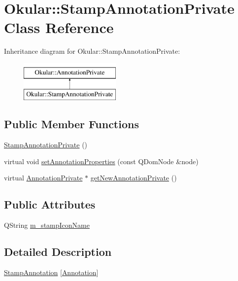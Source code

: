 \hypertarget{classOkular_1_1StampAnnotationPrivate}{\section{Okular\+:\+:Stamp\+Annotation\+Private Class Reference}
\label{classOkular_1_1StampAnnotationPrivate}
}
Inheritance diagram for Okular\+:\+:Stamp\+Annotation\+Private\+:\begin{figure}[H]
\begin{center}
\leavevmode
\includegraphics[height=2.000000cm]{classOkular_1_1StampAnnotationPrivate}
\end{center}
\end{figure}
\subsection*{Public Member Functions}
\begin{DoxyCompactItemize}
\item 
\hyperlink{classOkular_1_1StampAnnotationPrivate_abf10ead1f7fea1bc1c900da707e0908d}{Stamp\+Annotation\+Private} ()
\item 
virtual void \hyperlink{classOkular_1_1StampAnnotationPrivate_a7c9d1cfd69ab82bdc9fa8d718a933801}{set\+Annotation\+Properties} (const Q\+Dom\+Node \&node)
\item 
virtual \hyperlink{classOkular_1_1AnnotationPrivate}{Annotation\+Private} $\ast$ \hyperlink{classOkular_1_1StampAnnotationPrivate_a43e8ee99a2e2b3454a5decdd3311871a}{get\+New\+Annotation\+Private} ()
\end{DoxyCompactItemize}
\subsection*{Public Attributes}
\begin{DoxyCompactItemize}
\item 
Q\+String \hyperlink{classOkular_1_1StampAnnotationPrivate_aaa0eb79998614b5fe42f55b97ead553b}{m\+\_\+stamp\+Icon\+Name}
\end{DoxyCompactItemize}


\subsection{Detailed Description}
\hyperlink{classOkular_1_1StampAnnotation}{Stamp\+Annotation} \mbox{[}\hyperlink{classOkular_1_1Annotation}{Annotation}\mbox{]} 


